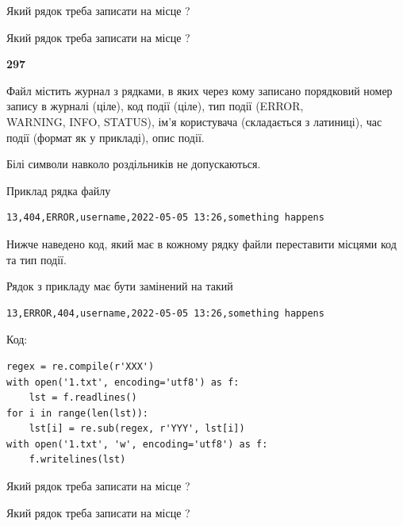 Який рядок треба записати на місце  ?\par
\vspace{5mm}


Який рядок треба записати на місце  ?\par


\newpage

{\begin {center}\textbf{ 297}\end {center}}\par
Файл  містить журнал з рядками, в яких через кому записано поряд\-ко\-вий номер запису в журналі (ціле), код події (ціле), тип події (ERROR,\\ WARNING, INFO, STATUS), ім'я користувача (складається з латиниці), час події (фор\-мат як у прикладі), опис події.

Білі символи навколо роздільників не допускаються.

Приклад рядка файлу



\begin{verbatim}
13,404,ERROR,username,2022-05-05 13:26,something happens
\end{verbatim}


Нижче наведено код, який має в кожному рядку файли переставити місцями код та тип події.

Рядок з прикладу має бути замінений на такий



\begin{verbatim}
13,ERROR,404,username,2022-05-05 13:26,something happens
\end{verbatim}




Код:



\begin{verbatim}
regex = re.compile(r'XXX')
with open('1.txt', encoding='utf8') as f:
    lst = f.readlines()
for i in range(len(lst)):
    lst[i] = re.sub(regex, r'YYY', lst[i])
with open('1.txt', 'w', encoding='utf8') as f:
    f.writelines(lst)
\end{verbatim}







Який рядок треба записати на місце  ?\par
\vspace{5mm}


Який рядок треба записати на місце  ?\par


